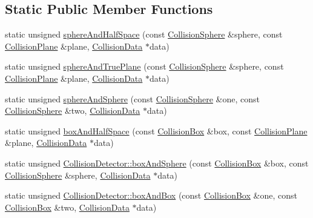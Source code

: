 \subsection*{Static Public Member Functions}
\begin{DoxyCompactItemize}
\item 
static unsigned \hyperlink{classrum_1_1_collision_detector_aa8233133673f7ca419ba71099eb32487}{sphere\+And\+Half\+Space} (const \hyperlink{classrum_1_1_collision_sphere}{Collision\+Sphere} \&sphere, const \hyperlink{classrum_1_1_collision_plane}{Collision\+Plane} \&plane, \hyperlink{classrum_1_1_collision_data}{Collision\+Data} $\ast$data)
\item 
static unsigned \hyperlink{classrum_1_1_collision_detector_a7e5d21b3b21f19ab68f9dfbbff321864}{sphere\+And\+True\+Plane} (const \hyperlink{classrum_1_1_collision_sphere}{Collision\+Sphere} \&sphere, const \hyperlink{classrum_1_1_collision_plane}{Collision\+Plane} \&plane, \hyperlink{classrum_1_1_collision_data}{Collision\+Data} $\ast$data)
\item 
static unsigned \hyperlink{classrum_1_1_collision_detector_a9498c9f732f1df8ae84c8be081a04bee}{sphere\+And\+Sphere} (const \hyperlink{classrum_1_1_collision_sphere}{Collision\+Sphere} \&one, const \hyperlink{classrum_1_1_collision_sphere}{Collision\+Sphere} \&two, \hyperlink{classrum_1_1_collision_data}{Collision\+Data} $\ast$data)
\item 
static unsigned \hyperlink{classrum_1_1_collision_detector_a6cbc4102877984c47a74d3be88559dac}{box\+And\+Half\+Space} (const \hyperlink{classrum_1_1_collision_box}{Collision\+Box} \&box, const \hyperlink{classrum_1_1_collision_plane}{Collision\+Plane} \&plane, \hyperlink{classrum_1_1_collision_data}{Collision\+Data} $\ast$data)
\item 
static unsigned \hyperlink{classrum_1_1_collision_detector_a33c8f3cf6e8933b8ef8a4d87e7945630}{Collision\+Detector\+::box\+And\+Sphere} (const \hyperlink{classrum_1_1_collision_box}{Collision\+Box} \&box, const \hyperlink{classrum_1_1_collision_sphere}{Collision\+Sphere} \&sphere, \hyperlink{classrum_1_1_collision_data}{Collision\+Data} $\ast$data)
\item 
static unsigned \hyperlink{classrum_1_1_collision_detector_a54f8f7e13166eadb4d7b06025d9176bf}{Collision\+Detector\+::box\+And\+Box} (const \hyperlink{classrum_1_1_collision_box}{Collision\+Box} \&one, const \hyperlink{classrum_1_1_collision_box}{Collision\+Box} \&two, \hyperlink{classrum_1_1_collision_data}{Collision\+Data} $\ast$data)
\end{DoxyCompactItemize}


